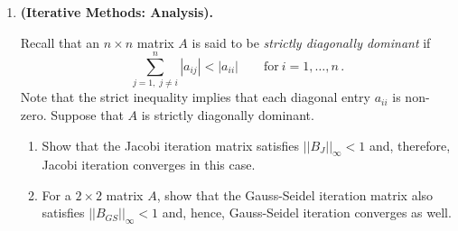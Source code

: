 \documentclass [12pt]{article}
\begin{document}
\begin{enumerate}
\begin{enumerate}

\item
Write a program that takes the output $A$ and $p$ from  problem \# 4, along with a righthand side $b$, and computes the solution
of $Ax=b$ by performing the forward and backward substitution
steps.  If you are using MATLAB, name your m-file lusolve.m.
The first line of your code lusolve.m should be
as follows:
\begin{verbatim}
function x=lusolve(a,p,b)
(your code here!)
\end{verbatim}
{\bf Turn in a copy of your code}.

\item
The famous Hilbert matrices are given
by $H_{ij}=1/(i+j-1)$. The $n \times n$ Hilbert matrix $H_n$ is easily
produced in MATLAB using {\it hilb(n)}.  Assume the true solution of
$H_nx=b$ for a given $n$ is $x={[1, \ldots ,1]}^T$.
Hence the righthand side $b$ is simply the row sums of $H_n$,
and  $b$ is easily computed in MATLAB using {\it b=sum(hilb(n)')'}.
Use your codes mylu.m and lusolve.m to
solve the system $H_n x=b$ for $n=5, 10, 15, 20$.  For each $n$,
using the $\infty-\mbox{norm}$, compute the relative error and
the relative residual.  Discuss what is happening here.  You may
find it useful to look at the {\it cond} command in MATLAB.

\end{enumerate}

\item  \textbf{(Iterative Methods: Analysis).}

Recall that an $n \times n$  matrix $A$ is said to be {\it
strictly diagonally dominant} if
$$
\sum_{j = 1, \; j \neq i}^n \left| a_{ij} \right| < \left| a_{ii}
\right| \qquad \mbox{for} \ i=1,\ldots,n \,.
$$
Note that the strict inequality implies that each diagonal entry
$a_{ii}$ is non-zero. Suppose that $A$ is strictly diagonally
dominant.

\begin{enumerate}

\item Show that the Jacobi iteration matrix satisfies $||B_J
||_\infty < 1$ and, therefore, Jacobi iteration converges in this
case.

\item For a $2\times 2$ matrix $A$, show that the Gauss-Seidel
iteration matrix also satisfies $||B_{GS} ||_\infty < 1$ and,
hence, Gauss-Seidel iteration converges as well.


\end{enumerate}
\end{enumerate}
\end{document}
